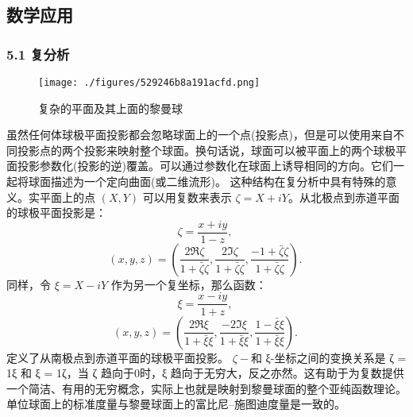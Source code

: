 \subsection{数学应用}
\subsubsection{5.1 复分析}
\begin{figure}[ht]
\centering
\texttt{[image: ./figures/529246b8a191acfd.png]}
\caption{复杂的平面及其上面的黎曼球} \label{fig_QJPMTY_17}
\end{figure}
虽然任何体球极平面投影都会忽略球面上的一个点(投影点)，但是可以使用来自不同投影点的两个投影来映射整个球面。换句话说，球面可以被平面上的两个球极平面投影参数化(投影的逆)覆盖。可以通过参数化在球面上诱导相同的方向。它们一起将球面描述为一个定向曲面(或二维流形)。
这种结构在复分析中具有特殊的意义。实平面上的点 $(X, Y)$ 可以用复数来表示 $\zeta = X + iY$。从北极点到赤道平面的球极平面投影是：
$$\zeta = \frac{x + iy}{1 - z},~$$
$$(x, y, z) = \left( \frac{2 \Re \zeta}{1 + \bar{\zeta}\zeta }, \frac{2 \Im \zeta}{1 + \bar{\zeta}\zeta }, \frac{-1 + \bar{\zeta}\zeta }{1 + \bar{\zeta}\zeta } \right).~$$
同样，令 $\xi = X - iY$ 作为另一个复坐标，那么函数：
$$\xi = \frac{x - iy}{1 + z},~$$
$$(x, y, z) = \left( \frac{2 \Re \xi}{1 +\bar{\xi} \xi }, \frac{-2 \Im \xi}{1 + \bar{\xi}\xi }, \frac{1 -\bar{\xi} \xi}{1 + \bar{\xi}\xi } \right).~$$
定义了从南极点到赤道平面的球极平面投影。 $\zeta-$和 ξ-坐标之间的变换关系是 ζ = 1ξ 和 ξ = 1ζ，当 ζ 趋向于0时，ξ 趋向于无穷大，反之亦然。这有助于为复数提供一个简洁、有用的无穷概念，实际上也就是映射到黎曼球面的整个亚纯函数理论。单位球面上的标准度量与黎曼球面上的富比尼–施图迪度量是一致的。